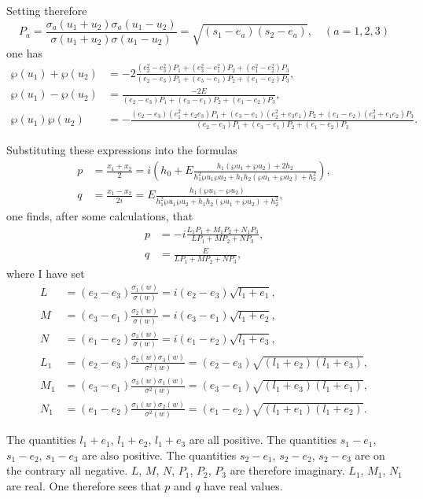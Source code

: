 \documentclass{article}
\begin{document}
Setting therefore
\[
P_a = \frac{\sigma_a(u_1 + u_2)\sigma_a(u_1 - u_2)}{\sigma(u_1 + u_2)\sigma(u_1 - u_2)} = \sqrt{\left(s_1-e_a\right)\left(s_2-e_a\right)}, \quad (a = 1, 2, 3)
\]
one has
\begin{align*}
\wp(u_1) + \wp(u_2) &= -2\frac{(e_2^2 - e_3^2)P_1 + (e_3^2 - e_1^2)P_2 + (e_1^2 - e_2^2)P_3}{(e_2 - e_3)P_1 + (e_3 - e_1)P_2 + (e_1 - e_2)P_3}, \\
\wp(u_1) - \wp(u_2) &= \frac{-2E}{(e_2 - e_3)P_1 + (e_3 - e_1)P_2 + (e_1 - e_2)P_3}, \\
\wp(u_1)\wp(u_2) &= -\frac{(e_2 - e_3)(e_1^2 + e_2e_3)P_1 + (e_3 - e_1)(e_2^2 + e_3e_1)P_2 + (e_1 - e_2)(e_3^2 + e_1e_2)P_3}{(e_2 - e_3)P_1 + (e_3 - e_1)P_2 + (e_1 - e_2)P_3}.
\end{align*}

Substituting these expressions into the formulas
\begin{align*}
p &= \frac{x_1 + x_2}{2} = i\left(h_0 + E\frac{h_1(\wp u_1 + \wp u_2) + 2h_2}{h_1^2\wp u_1\wp u_2 + h_1h_2(\wp u_1 + \wp u_2) + h_2^2}\right), \\
q &= \frac{x_1 - x_2}{2i} = E\frac{h_1(\wp u_1 - \wp u_2)}{h_1^2\wp u_1\wp u_2 + h_1h_2(\wp u_1 + \wp u_2) + h_2^2},
\end{align*}
one finds, after some calculations, that
\begin{align*}
p &= -i\frac{L_1P_1 + M_1P_2 + N_1P_3}{LP_1 + MP_2 + NP_3}, \\
q &= \frac{E}{LP_1 + MP_2 + NP_3},
\end{align*}
where I have set
\begin{align*}
L &= (e_2 - e_3)\frac{\sigma_1(w)}{\sigma(w)} = i(e_2 - e_3)\sqrt{l_1 + e_1}, \\
M &= (e_3 - e_1)\frac{\sigma_2(w)}{\sigma(w)} = i(e_3 - e_1)\sqrt{l_1 + e_2}, \\
N &= (e_1 - e_2)\frac{\sigma_3(w)}{\sigma(w)} = i(e_1 - e_2)\sqrt{l_1 + e_3}, \\
L_1 &= (e_2 - e_3)\frac{\sigma_2(w)\sigma_3(w)}{\sigma^2(w)} = (e_2 - e_3)\sqrt{(l_1 + e_2)(l_1 + e_3)}, \\
M_1 &= (e_3 - e_1)\frac{\sigma_3(w)\sigma_1(w)}{\sigma^2(w)} = (e_3 - e_1)\sqrt{(l_1 + e_3)(l_1 + e_1)}, \\
N_1 &= (e_1 - e_2)\frac{\sigma_1(w)\sigma_2(w)}{\sigma^2(w)} = (e_1 - e_2)\sqrt{(l_1 + e_1)(l_1 + e_2)}.
\end{align*}

The quantities $l_1 + e_1$, $l_1 + e_2$, $l_1 + e_3$ are all positive.
The quantities $s_1 - e_1$, $s_1 - e_2$, $s_1 - e_3$ are also positive.
The quantities $s_2 - e_1$, $s_2 - e_2$, $s_2 - e_3$ are on the contrary all negative.
$L$, $M$, $N$, $P_1$, $P_2$, $P_3$ are therefore imaginary.
$L_1$, $M_1$, $N_1$ are real.
One therefore sees that $p$ and $q$ have real values.
\end{document}
